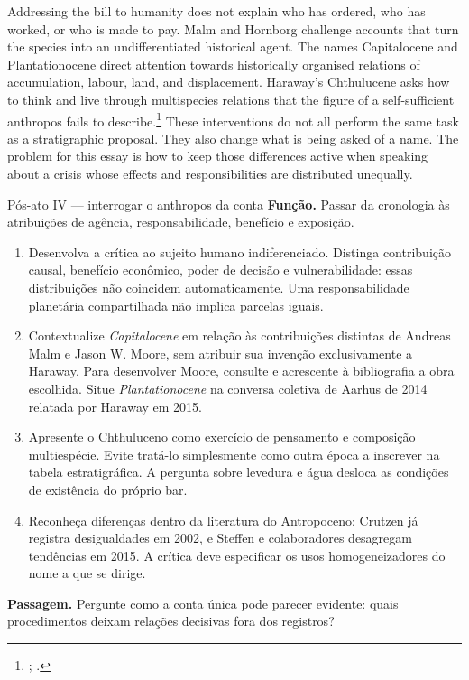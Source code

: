 Addressing the bill to humanity does not explain who has ordered, who has
worked, or who is made to pay. Malm and Hornborg challenge accounts that
turn the species into an undifferentiated historical agent.
The names Capitalocene and Plantationocene direct attention towards
historically organised relations of accumulation, labour, land, and
displacement. Haraway's Chthulucene asks how to think and live through
multispecies relations that the figure of a self-sufficient anthropos
fails to describe.\footnote{; .}
These interventions do not all perform the same task as a stratigraphic
proposal. They also change what is being asked of a name. The problem
for this essay is how to keep those differences active when speaking
about a crisis whose effects and responsibilities are distributed unequally.

\begin{orientacao}{Pós-ato IV --- interrogar o anthropos da conta}
\textbf{Função.} Passar da cronologia às atribuições de agência,
responsabilidade, benefício e exposição.
\begin{enumerate}
\item Desenvolva a crítica ao sujeito humano indiferenciado. Distinga
contribuição causal, benefício econômico, poder de decisão e
vulnerabilidade: essas distribuições não coincidem automaticamente.
Uma responsabilidade planetária compartilhada não implica parcelas iguais.
\item Contextualize \textit{Capitalocene} em relação às contribuições
distintas de Andreas Malm e Jason W. Moore, sem atribuir sua invenção
exclusivamente a Haraway. Para desenvolver Moore, consulte e acrescente
à bibliografia a obra escolhida. Situe \textit{Plantationocene} na
conversa coletiva de Aarhus de 2014 relatada por Haraway em 2015.
\item Apresente o Chthuluceno como exercício de pensamento e composição
multiespécie. Evite tratá-lo simplesmente como outra época a inscrever
na tabela estratigráfica. A pergunta sobre levedura e água desloca
as condições de existência do próprio bar.
\item Reconheça diferenças dentro da literatura do Antropoceno:
Crutzen já registra desigualdades em 2002, e Steffen e colaboradores
desagregam tendências em 2015. A crítica deve especificar os usos
homogeneizadores do nome a que se dirige.
\end{enumerate}
\textbf{Passagem.} Pergunte como a conta única pode parecer evidente:
quais procedimentos deixam relações decisivas fora dos registros?
\end{orientacao}

